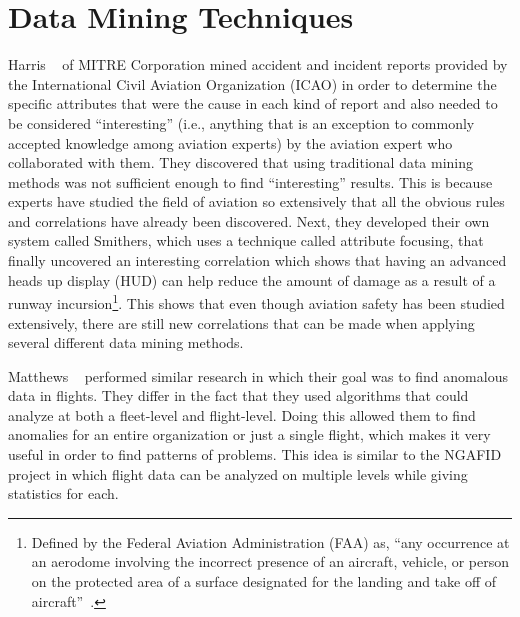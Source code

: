 \section{Data Mining Techniques}

	Harris \etal~\cite{harris-jr.1998recent} of MITRE Corporation mined accident and incident reports provided by the International Civil Aviation Organization (ICAO) in order to determine the specific attributes that were the cause in each kind of report and also needed to be considered ``interesting'' (i.e., anything that is an exception to commonly accepted knowledge among aviation experts) by the aviation expert who collaborated with them.  They discovered that using traditional data mining methods was not sufficient enough to find ``interesting'' results.  This is because experts have studied the field of aviation so extensively that all the obvious rules and correlations have already been discovered.  Next, they developed their own system called Smithers, which uses a technique called attribute focusing, that finally uncovered an interesting correlation which shows that having an advanced heads up display (HUD) can help reduce the amount of damage as a result of a runway incursion\footnote{Defined by the Federal Aviation Administration (FAA) as, ``any occurrence at an aerodome involving the incorrect presence of an aircraft, vehicle, or person on the protected area of a surface designated for the landing and take off of aircraft''~\cite{federal-aviation-administrationrunway}.}.  This shows that even though aviation safety has been studied extensively, there are still new correlations that can be made when applying several different data mining methods.
    
    Matthews \etal~\cite{matthews2013discovering} performed similar research in which their goal was to find anomalous data in flights.  They differ in the fact that they used algorithms that could analyze at both a fleet-level and flight-level.  Doing this allowed them to find anomalies for an entire organization or just a single flight, which makes it very useful in order to find patterns of problems.  This idea is similar to the NGAFID project in which flight data can be analyzed on multiple levels while giving statistics for each.

